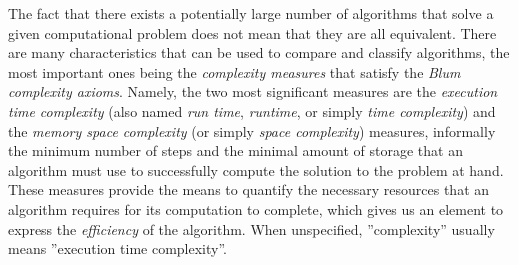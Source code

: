 	The fact that there exists a potentially large number of algorithms %
	that solve a given computational problem does not mean that they are all equivalent. %
	There are many characteristics that can be used to compare and classify algorithms, the most important ones being the \emph{complexity measures} that satisfy the \emph{Blum complexity axioms}.
	Namely, the two most significant measures are the \emph{execution time complexity} (also named \emph{run time}, \emph{runtime}, or simply \emph{time complexity}) and the \emph{memory space complexity} (or simply \emph{space complexity}) measures, informally the minimum number of steps and the minimal amount of storage that an algorithm must use to successfully compute the solution to the problem at hand.
	These measures provide the means to quantify the necessary resources that an algorithm requires for its computation to complete, which gives us an element to express the \emph{efficiency} of the algorithm.
	When unspecified, ''complexity'' usually means ''execution time complexity''.

